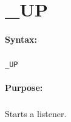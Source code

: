 
\newpage
\section{\_UP}
\label{cmd:_UP}

\paragraph{Syntax:}
\subparagraph{}
\texttt{\_UP}

\paragraph{Purpose:}
\subparagraph{}
Starts a listener.
